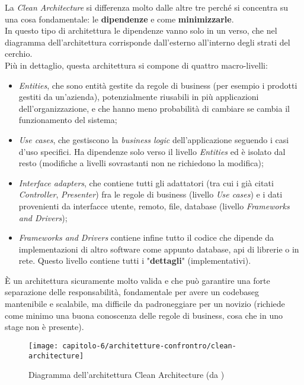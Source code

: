 La \emph{Clean Architecture} si differenza molto dalle altre tre perché si concentra su una cosa fondamentale: le \textbf{dipendenze} e come \textbf{minimizzarle}.\\
In questo tipo di architettura le dipendenze vanno solo in un verso, che nel diagramma dell'architettura corrisponde dall'esterno all'interno degli strati del cerchio.\\
Più in dettaglio, questa architettura si compone di quattro macro-livelli:
\begin{itemize}
    \item \emph{Entities}, che sono entità gestite da regole di business (per esempio i prodotti gestiti da un'azienda), potenzialmente riusabili in più applicazioni dell'organizzazione, e che hanno meno probabilità di cambiare se cambia il funzionamento del sistema;
    \item \emph{Use cases}, che gestiscono la \emph{business logic} dell'applicazione seguendo i casi d'uso specifici. Ha dipendenze solo verso il livello \emph{Entities} ed è isolato dal resto (modifiche a livelli sovrastanti non ne richiedono la modifica);
    \item \emph{Interface adapters}, che contiene tutti gli adattatori (tra cui i già citati \emph{Controller}, \emph{Presenter}) fra le regole di business (livello \emph{Use cases}) e i dati provenienti da interfacce utente, remoto, file, database (livello \emph{Frameworks and Drivers});
    \item \emph{Frameworks and Drivers} contiene infine tutto il codice che dipende da implementazioni di altro software come appunto database, \gls{api} di librerie o in rete. Questo livello contiene tutti i "\textbf{dettagli}" (implementativi).
\end{itemize}
È un architettura sicuramente molto valida e che può garantire una forte separazione delle responsabilità, fondamentale per avere un \gls{codebaseg} mantenibile e scalabile, ma difficile da padroneggiare per un novizio (richiede come minimo una buona conoscenza delle regole di business, cosa che in uno stage non è presente).

\begin{figure}[!h]
    \centering 
    \texttt{[image: capitolo-6/architetture-confrontro/clean-architecture]} 
    \caption{Diagramma dell'architettura Clean Architecture (da \cite{site:clean-architecture})}
\end{figure}